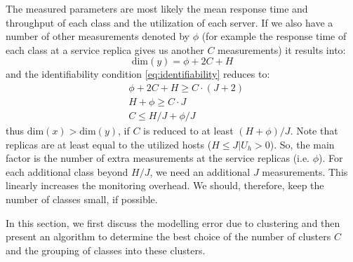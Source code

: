   The measured parameters are most likely the mean response time and throughput of each class and the utilization of each server. If we also have a number of other measurements denoted by $\phi$ (for example the response time of each class at a service replica gives us another $C$ measurements) it results into: \[ \text{dim}(y) = \phi+2C + H\]  and the identifiability condition \ref{eq:identifiability} reduces to:
 \begin{align}  
 & \phi+2C + H \geq  C\cdot (J+2)  \\  
 & H+\phi \geq C\cdot J \\ 
  & C \leq H/J+\phi/J
  \end{align}    
   thus $\text{dim}(x)> \text{dim}(y)$, if $C$ is reduced to at least $(H+\phi)/J$. 
 Note that replicas are at least equal to the utilized hosts ($H\leq J|U_h>0$). So, the main factor is the number of extra measurements at the service replicas (i.e. $\phi$).  
For each additional class beyond $H/J$, we need an additional $J$ measurements. 
This linearly increases the monitoring overhead.
We should, therefore, keep the number of classes small, if possible. 

%

In this section, we first discuss the modelling error due to clustering and then present an algorithm to determine the best choice of the number of clusters $C$ and the grouping of classes into these clusters.

